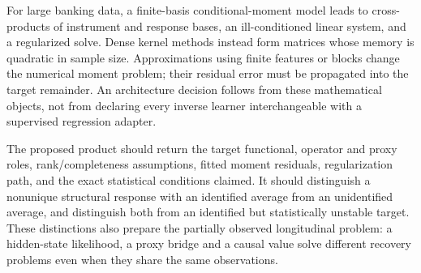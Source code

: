 For large banking data, a finite-basis conditional-moment model leads to
cross-products of instrument and response bases, an ill-conditioned
linear system, and a regularized solve. Dense kernel methods instead
form matrices whose memory is quadratic in sample size. Approximations
using finite features or blocks change the numerical moment problem;
their residual error must be propagated into the target remainder.
An architecture decision follows from these mathematical objects,
not from declaring every inverse learner interchangeable with a
supervised regression adapter.

The proposed product should return the target functional, operator and
proxy roles, rank/completeness assumptions, fitted moment residuals,
regularization path, and the exact statistical conditions claimed.
It should distinguish a nonunique structural response with an identified
average from an unidentified average, and distinguish both from an
identified but statistically unstable target. These distinctions also
prepare the partially observed longitudinal problem: a hidden-state
likelihood, a proxy bridge and a causal value solve different recovery
problems even when they share the same observations.
